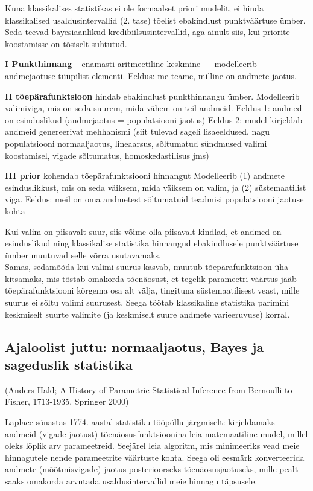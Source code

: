 \documentclass[]{book}
\begin{document}
Kuna klassikalises statistikas ei ole formaalset priori mudelit, ei hinda klassikalised usaldusintervallid (2. tase) tõelist ebakindlust punktväärtuse ümber. Seda teevad bayesiaanlikud kredibiilsusintervallid, aga ainult siis, kui priorite koostamisse on tõsiselt suhtutud.

\textbf{I Punkthinnang} -- enamasti aritmeetiline keskmine --- modelleerib andmejaotuse tüüpilist elementi.
Eeldus: me teame, milline on andmete jaotus.

\textbf{II tõepärafunktsioon} hindab ebakindlust punkthinnangu ümber.
Modelleerib valimiviga, mis on seda suurem, mida vähem on teil andmeid.
Eeldus 1: andmed on esinduslikud (andmejaotus = populatsiooni jaotus)
Eeldus 2: mudel kirjeldab andmeid genereerivat mehhanismi (siit tulevad sageli lisaeeldused, nagu populatsiooni normaaljaotus, lineaarsus, sõltumatud sündmused valimi koostamisel, vigade sõltumatus, homoskedastilisus jms)

\textbf{III prior} kohendab tõepärafunktsiooni hinnangut
Modelleerib (1) andmete esinduslikkust, mis on seda väiksem, mida väiksem on valim, ja (2) süstemaatilist viga.
Eeldus: meil on oma andmetest sõltumatuid teadmisi populatsiooni jaotuse kohta

Kui valim on piisavalt suur, siis võime olla piisavalt kindlad, et andmed on esinduslikud ning klassikalise statistika hinnangud ebakindlusele punktväärtuse ümber muutuvad selle võrra usutavamaks.\\
Samas, sedamõõda kui valimi suurus kasvab, muutub tõepärafunktsioon üha kitsamaks, mis tõstab omakorda tõenäosust, et tegelik parameetri väärtus jääb tõepärafunktsiooni kõrgema osa alt välja, tingituna süstemaatilisest veast, mille suurus ei sõltu valimi suurusest. Seega töötab klassikaline statistika parimini keskmiselt suurte valimite (ja keskmiselt suure andmete varieeruvuse) korral.

\hypertarget{ajaloolist-juttu-normaaljaotus-bayes-ja-sageduslik-statistika-1}{%
\subsection{Ajaloolist juttu: normaaljaotus, Bayes ja sageduslik statistika}\label{ajaloolist-juttu-normaaljaotus-bayes-ja-sageduslik-statistika-1}}

(Anders Hald; A History of Parametric Statistical Inference from Bernoulli to Fisher, 1713-1935, Springer 2000)

Laplace sõnastas 1774. aastal statistiku tööpõllu järgmiselt: kirjeldamaks andmeid (vigade jaotust) tõenäosusfunktsioonina leia matemaatiline mudel, millel oleks lõplik arv parameetreid. Seejärel leia algoritm, mis minimeeriks vead meie hinnagutele nende parameetrite väärtuste kohta. Seega oli eesmärk konverteerida andmete (mõõtmisvigade) jaotus posterioorseks tõenäosusjaotuseks, mille pealt saaks omakorda arvutada usaldusintervallid meie hinnagu täpsusele.
\end{document}
